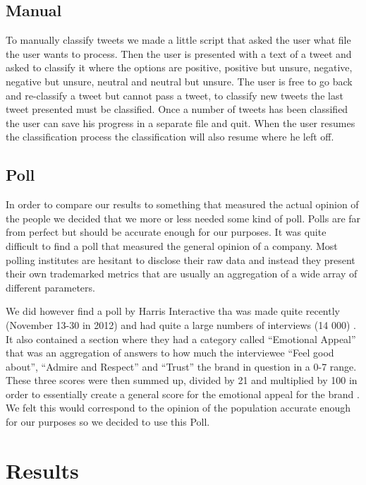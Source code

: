 \documentclass[a4paper,12pt]{report}
\begin{document}
\section{Manual}

To manually classify tweets we made a little script that asked the user what file the user wants to process. 
Then the user is presented with a text of a tweet and asked to classify it where the options are positive, positive but unsure, negative, negative but unsure, neutral and neutral but unsure. 
The user is free to go back and re-classify a tweet but cannot pass a tweet, to classify new tweets the last tweet presented must be classified. 
Once a number of tweets has been classified the user can save his progress in a separate file and quit. 
When the user resumes the classification process the classification will also resume where he left off.

\section{Poll}

In order to compare our results to something that measured the actual opinion of the people we decided that we more or less needed some kind of poll. 
Polls are far from perfect but should be accurate enough for our purposes. It was quite difficult to find a poll that measured the general opinion of a company. 
Most polling institutes are hesitant to disclose their raw data and instead they present their own trademarked metrics that are usually an aggregation of a wide array of different parameters.

We did however find a poll by Harris Interactive tha was made quite recently (November 13-30 in 2012) and had quite a large numbers of interviews (14 000) \cite{Harris13}. 
It also contained a section where they had a category called “Emotional Appeal” that was an aggregation of answers to how much the interviewee “Feel good about”, “Admire and Respect” and “Trust” the brand in question in a 0-7 range. 
These three scores were then summed up, divided by 21 and multiplied by 100 in order to essentially create a general score for the emotional appeal for the brand \cite{Harris13}. 
We felt this would correspond to the opinion of the population accurate enough for our purposes so we decided to use this Poll.

\chapter{Results}
\end{document}

